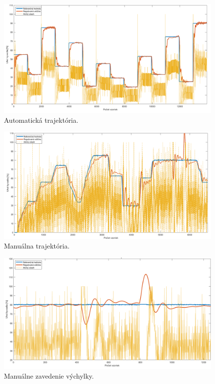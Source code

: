\begin{figure}[!tbh]
	\centering
	\includegraphics[width=150mm]{obr/Auto3.png}
	\caption{Automatická trajektória.}\label{OBRAZOK 2.5.2}
\end{figure}
\begin{figure}[!tbh]
	\centering
	\includegraphics[width=150mm]{obr/potentio.png}
	\caption{Manuálna trajektória.}\label{OBRAZOK 2.5.3}
\end{figure}

\begin{figure}[!tbh]
	\centering
	\includegraphics[width=\textwidth]{obr/BuchnutieKyvadla.png}
	\caption{Manuálne zavedenie výchylky.}\label{OBRAZOK 2.5.4}
\end{figure}


